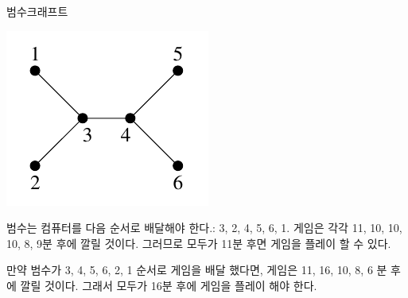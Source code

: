 \begin{problem}{범수크래프트}
	\begin{example}
	\end{example}

\Notes

\includegraphics[]{far.png}

범수는 컴퓨터를 다음 순서로 배달해야 한다.: 3, 2, 4, 5, 6, 1. 게임은 각각 11, 10, 10, 10, 8, 9분 후에 깔릴 것이다. 그러므로 모두가 11분 후면 게임을 플레이 할 수 있다.

만약 범수가 3, 4, 5, 6, 2, 1 순서로 게임을 배달 했다면, 게임은 11, 16, 10, 8, 6 분 후에 깔릴 것이다. 그래서 모두가 16분 후에 게임을 플레이 해야 한다.

\end{problem}

